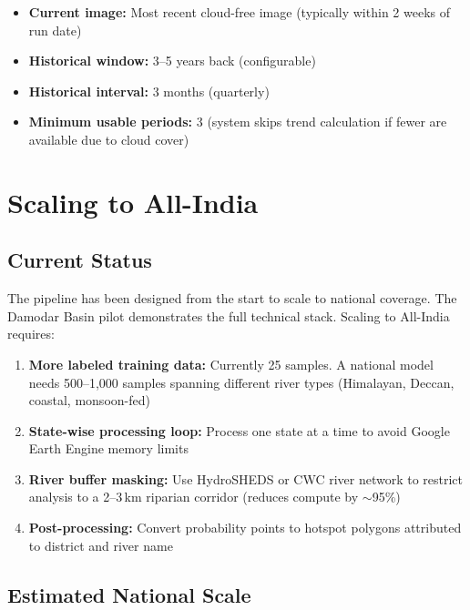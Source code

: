\documentclass[12pt, a4paper]{article}
\begin{document}
\begin{itemize}[noitemsep]
  \item \textbf{Current image:} Most recent cloud-free image (typically
        within 2 weeks of run date)
  \item \textbf{Historical window:} 3--5 years back (configurable)
  \item \textbf{Historical interval:} 3 months (quarterly)
  \item \textbf{Minimum usable periods:} 3 (system skips trend calculation
        if fewer are available due to cloud cover)
\end{itemize}

\section{Scaling to All-India}

\subsection{Current Status}

The pipeline has been designed from the start to scale to national
coverage. The Damodar Basin pilot demonstrates the full technical
stack. Scaling to All-India requires:

\begin{enumerate}
  \item \textbf{More labeled training data:} Currently 25 samples.
        A national model needs 500--1,000 samples spanning different
        river types (Himalayan, Deccan, coastal, monsoon-fed)
  \item \textbf{State-wise processing loop:} Process one state at a
        time to avoid Google Earth Engine memory limits
  \item \textbf{River buffer masking:} Use HydroSHEDS or CWC river
        network to restrict analysis to a 2--3\,km riparian corridor
        (reduces compute by $\sim$95\%)
  \item \textbf{Post-processing:} Convert probability points to
        hotspot polygons attributed to district and river name
\end{enumerate}

\subsection{Estimated National Scale}
\end{document}

